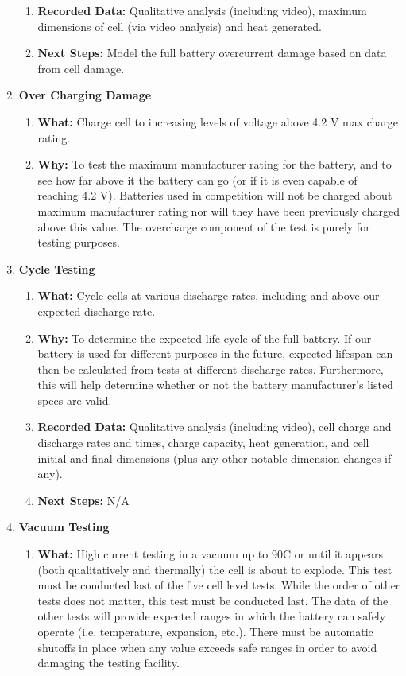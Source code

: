 \documentclass[main.tex]{subfiles}
\begin{document}
\begin{enumerate}
\begin{enumerate}
            \item \textbf{Recorded Data: }Qualitative analysis (including video), maximum dimensions of cell (via video analysis) and heat generated.
            \item \textbf{Next Steps: }Model the full battery overcurrent damage based on data from cell damage.
        \end{enumerate}
        \item \textbf{Over Charging Damage}
        \begin{enumerate}
            \item \textbf{What: }Charge cell to increasing levels of voltage above 4.2 V max charge rating.
            \item \textbf{Why: }To test the maximum manufacturer rating for the battery, and to see how far above it the battery can go (or if it is even capable of reaching 4.2 V). Batteries used in competition will not be charged about maximum manufacturer rating nor will they have been previously charged above this value. The overcharge component of the test is purely for testing purposes.
        \end{enumerate}
        \item \textbf{Cycle Testing}
        \begin{enumerate}
            \item \textbf{What: }Cycle cells at various discharge rates, including and above our expected discharge rate.
            \item \textbf{Why: }To determine the expected life cycle of the full battery. If our battery is used for different purposes in the future, expected lifespan can then be calculated from tests at different discharge rates. Furthermore, this will help determine whether or not the battery manufacturer’s listed specs are valid.
            \item \textbf{Recorded Data: }Qualitative analysis (including video), cell charge and discharge rates and times, charge capacity, heat generation, and cell initial and final dimensions (plus any other notable dimension changes if any).
            \item \textbf{Next Steps: }N/A
        \end{enumerate}
        \item \textbf{Vacuum Testing}
        \begin{enumerate}
            \item \textbf{What: }High current testing in a vacuum up to 90C or until it appears (both qualitatively and thermally) the cell is about to explode. This test must be conducted last of the five cell level tests. While the order of other tests does not matter, this test must be conducted last. The data of the other tests will provide expected ranges in which the battery can safely operate (i.e. temperature, expansion, etc.). There must be automatic shutoffs in place when any value exceeds safe ranges in order to avoid damaging the testing facility.

\end{enumerate}
\end{enumerate}
\end{document}
